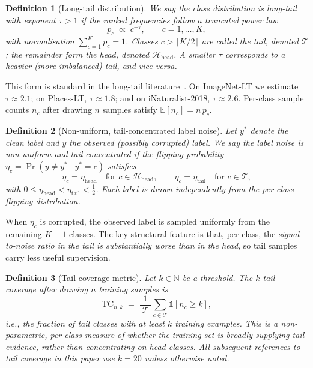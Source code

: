 \documentclass[11pt]{article}
\newtheorem{definition}{Definition}
\begin{document}
\begin{definition}[Long-tail distribution]
\label{def:long_tail}
We say the class distribution is \emph{long-tail} with exponent $\tau > 1$ if the ranked frequencies follow a truncated power law
\[
p_c \;\propto\; c^{-\tau}, \qquad c = 1, \ldots, K,
\]
with normalisation $\sum_{c=1}^{K} p_c = 1$. Classes $c > \lceil K/2 \rceil$ are called the \emph{tail}, denoted $\mathcal{T}$; the remainder form the \emph{head}, denoted $\mathcal{H}_{\mathrm{head}}$. A smaller $\tau$ corresponds to a heavier (more imbalanced) tail, and vice versa.
\end{definition}

This form is standard in the long-tail literature~\cite{liu2019longtail, cui2019classbalanced}. On ImageNet-LT we estimate $\tau \approx 2.1$; on Places-LT, $\tau \approx 1.8$; and on iNaturalist-2018, $\tau \approx 2.6$. Per-class sample counts $n_c$ after drawing $n$ samples satisfy $\mathbb{E}[n_c] = n \, p_c$.

\begin{definition}[Non-uniform, tail-concentrated label noise]
\label{def:noise}
Let $y^{*}$ denote the clean label and $y$ the observed (possibly corrupted) label. We say the label noise is \emph{non-uniform and tail-concentrated} if the flipping probability $\eta_c = \Pr(y \neq y^{*} \mid y^{*} = c)$ satisfies
\[
\eta_c = \eta_{\mathrm{head}} \quad \text{for } c \in \mathcal{H}_{\mathrm{head}}, \qquad
\eta_c = \eta_{\mathrm{tail}} \quad \text{for } c \in \mathcal{T},
\]
with $0 \le \eta_{\mathrm{head}} < \eta_{\mathrm{tail}} < \tfrac{1}{2}$. Each label is drawn independently from the per-class flipping distribution.
\end{definition}

When $\eta_c$ is corrupted, the observed label is sampled uniformly from the remaining $K-1$ classes. The key structural feature is that, per class, the \emph{signal-to-noise ratio in the tail is substantially worse than in the head}, so tail samples carry less useful supervision.

\begin{definition}[Tail-coverage metric]
\label{def:tail_coverage}
Let $k \in \mathbb{N}$ be a threshold. The \emph{$k$-tail coverage} after drawing $n$ training samples is
\[
\mathrm{TC}_{n, k} \;=\; \frac{1}{|\mathcal{T}|} \sum_{c \in \mathcal{T}} \mathbb{1}[ n_c \ge k ],
\]
i.e., the fraction of tail classes with at least $k$ training examples. This is a non-parametric, per-class measure of whether the training set is \emph{broadly} supplying tail evidence, rather than concentrating on head classes. All subsequent references to tail coverage in this paper use $k = 20$ unless otherwise noted.
\end{definition}
\end{document}
